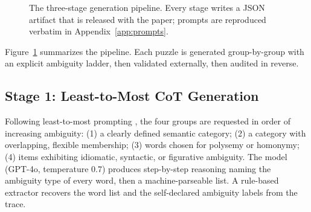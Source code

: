 \documentclass[11pt]{article}
\begin{document}
\begin{figure}[t]
\centering
{}
\caption{The three-stage generation pipeline. Every stage writes a JSON artifact that is released with the paper; prompts are reproduced verbatim in Appendix~\ref{app:prompts}.}
\label{fig:pipeline}
\end{figure}

Figure~\ref{fig:pipeline} summarizes the pipeline. Each puzzle is generated group-by-group with an explicit ambiguity ladder, then validated externally, then audited in reverse.

\subsection{Stage 1: Least-to-Most CoT Generation}
Following least-to-most prompting \citep{zhou2023least}, the four groups are requested in order of increasing ambiguity: (1) a clearly defined semantic category; (2) a category with overlapping, flexible membership; (3) words chosen for polysemy or homonymy; (4) items exhibiting idiomatic, syntactic, or figurative ambiguity. The model (GPT-4o, temperature 0.7) produces step-by-step reasoning naming the ambiguity type of every word, then a machine-parseable list. A rule-based extractor recovers the word list and the self-declared ambiguity labels from the trace.
\end{document}
